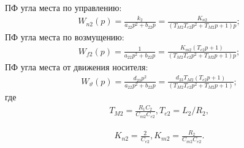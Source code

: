 ПФ угла места по управлению:
\begin{equation}
\label{eq:p4:s3.7}
\begin{multlined}
W_{n2}(p) = \frac{k_{2}}{a_{22}p^{2}+b_{22}p} = \frac{K_{n2}}{(T_{M2} T_{e2} p^2 + T_{M2} p +1)p};
\end{multlined}
\end{equation}
ПФ угла места по возмущению:
\begin{equation}
\label{eq:p4:s3.8}
\begin{multlined}
W_{f2}(p) = \frac{1}{a_{22}p^{2}+b_{22}p} =  \frac{K_{m2}(T_{e2} p + 1)}{(T_{M2} T_{e2} p^2 + T_{M2} p +1)p};
\end{multlined}
\end{equation}
ПФ угла места от движения носителя:
\begin{equation}
\label{eq:p4:s3.9}
\begin{multlined}
W_{\vartheta}(p) = \frac{d_{23} p^2}{a_{22}p^{2}+b_{22}p} = 
\frac{d_{23} T_{M2}(T_{e2} p + 1)}{(T_{M2} T_{e2} p^2 + T_{M2} p +1)};
\end{multlined}
\end{equation}
где 
\begin{equation}
\label{eq:p4:tt2}
\begin{aligned}
T_{M2} =\frac{R_1 C_2}{C_{m2}C_{e2}},
T_{e2} = L_2/R_2,
\end{aligned}
\end{equation}

\begin{equation}
\label{eq:p4:kk2}
\begin{aligned}
K_{n2}=\frac{2}{C_{e2}},
K_{m2}= \frac{R_2}{C_{m2}C_{e2}}.
\end{aligned}
\end{equation}

\begin{comment}
\subsection{Уравнения движения привода по азимуту} \label{subsec:ch4/sect3/sub1}

Линеаризованные уравнения движения азимутального привода совместно с объектом управления запишутся [29] [30] [31] [32] [33] [34]:

\subsection{Уравнения движения привода по углу места} \label{subsec:ch4/sect3/sub2}
\end{comment}




